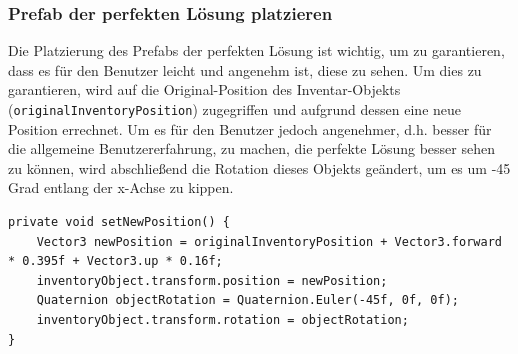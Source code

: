 \begin{itemize}
\subsubsection{Prefab der perfekten Lösung platzieren}
Die Platzierung des Prefabs der perfekten Lösung ist wichtig, um zu garantieren, dass es für den Benutzer leicht und
angenehm ist, diese zu sehen. Um dies zu garantieren, wird auf die Original-Position des Inventar-Objekts
(\texttt{originalInventoryPosition}) zugegriffen und aufgrund dessen eine neue Position errechnet. Um es für den Benutzer
jedoch angenehmer, d.h. besser für die allgemeine Benutzererfahrung, zu machen, die perfekte Lösung besser sehen zu
können, wird abschließend die Rotation dieses Objekts geändert, um es um -45 Grad entlang der x-Achse zu kippen.
\begin{lstlisting}[style=csharp, caption={Neue Position setzen}, label=code:newPos_PSV]
private void setNewPosition() {
    Vector3 newPosition = originalInventoryPosition + Vector3.forward * 0.395f + Vector3.up * 0.16f;
    inventoryObject.transform.position = newPosition;
    Quaternion objectRotation = Quaternion.Euler(-45f, 0f, 0f);
    inventoryObject.transform.rotation = objectRotation;
}
\end{lstlisting}\\


\end{itemize}
